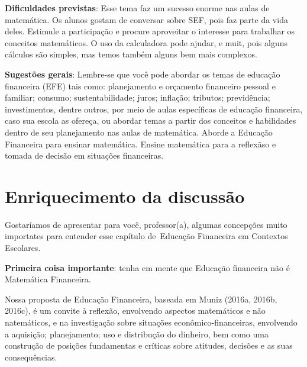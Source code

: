 \begin{paginatexto}
\textbf{Dificuldades previstas}: Esse tema faz um sucesso enorme nas aulas de matemática. Os alunos gostam de conversar sobre SEF, pois faz parte da vida deles. Estimule a participação e procure aproveitar o interesse para trabalhar os conceitos matemáticos. O uso da calculadora pode ajudar, e muit, pois alguns cálculos são simples, mas temos também alguns bem mais complexos.

\textbf{Sugestões gerais}: Lembre-se que você pode abordar os temas de educação financeira (EFE) tais como: planejamento e orçamento financeiro pessoal e familiar; consumo; sustentabilidade; juros; inflação; tributos; previdência; investimentos, dentre outros, por meio de aulas específicas de educação financeira, caso sua escola as ofereça, ou abordar temas a partir dos conceitos e habilidades dentro de seu planejamento nas aulas de matemática. Aborde a Educação Financeira para ensinar matemática. Ensine matemática para a reflexãso e tomada de decisão em situações financeiras.

\section*{Enriquecimento da discussão}

Gostaríamos de apresentar para você, professor(a), algumas concepções muito importates para entender esse capítulo de~Educação Financeira em Contextos Escolares.

\textbf{Primeira coisa importante}: tenha em mente que Educação financeira não é Matemática Financeira.

Nossa proposta de Educação Financeira, baseada em Muniz (2016a, 2016b, 2016c), é um convite à reflexão, envolvendo aspectos matemáticos e não natemáticos, e na investigação sobre situações econômico-financeiras, envolvendo a aquisição; planejamento; uso e distribução do dinheiro, bem como uma construção de posições fundamentas e críticas sobre atitudes, decisões e as suas consequências.


\end{paginatexto}
